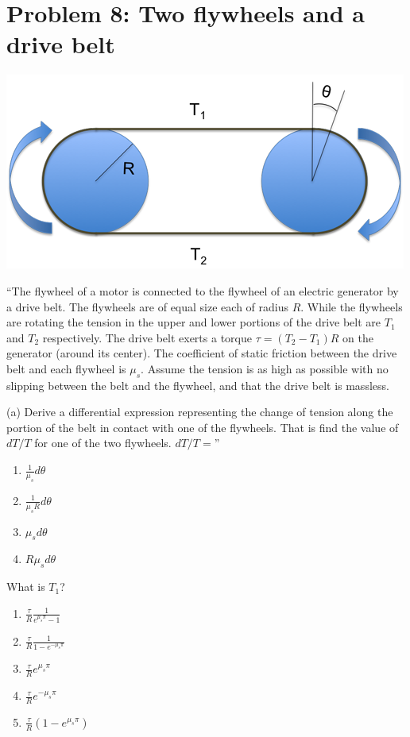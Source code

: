 \documentclass[8.01x]{subfiles}
\begin{document}
\section{Problem 8: Two flywheels and a drive belt}

\begin{center}
\includegraphics[scale=1.1]{Graphics/h9p8}
\end{center}

``The flywheel of a motor is connected to the flywheel of an electric generator by a drive belt. The flywheels are of equal size each of radius $R$. While the flywheels are rotating the tension in the upper and lower portions of the drive belt are $T_1$ and $T_2$ respectively. The drive belt exerts a torque $\tau = (T_2-T_1) R$ on the generator (around its center). The coefficient of static friction between the drive belt and each flywheel is $\mu_s$. Assume the tension is as high as possible with no slipping between the belt and the flywheel, and that the drive belt is massless.

(a) Derive a differential expression representing the change of tension along the portion of the belt in contact with one of the flywheels. That is find the value of $dT/T$ for one of the two flywheels. $dT/T = $''

\begin{enumerate}
\item $\displaystyle \frac{1}{\mu_s} d\theta$
\item $\displaystyle \frac{1}{\mu_s R} d\theta$
\item $\displaystyle \mu_s d\theta$
\item $\displaystyle R \mu_s d\theta$
\end{enumerate}

What is $T_1$?

\begin{enumerate}
\item $\displaystyle \frac{\tau}{R} \frac{1}{e^{\mu_s \pi} - 1}$
\item $\displaystyle \frac{\tau}{R} \frac{1}{1 - e^{-\mu_s \pi}}$
\item $\displaystyle \frac{\tau}{R} e^{\mu_s \pi}$
\item $\displaystyle \frac{\tau}{R} e^{-\mu_s \pi}$
\item $\displaystyle \frac{\tau}{R} (1 - e^{\mu_s \pi})$
\end{enumerate}
\end{document}
